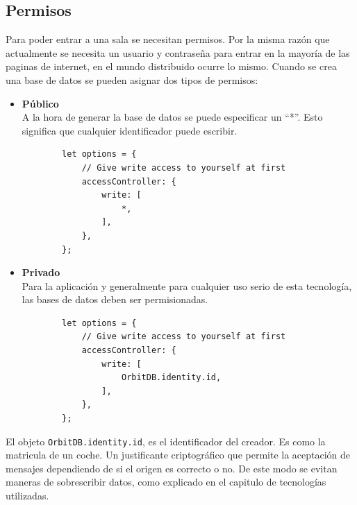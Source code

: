 \subsection{Permisos}
Para poder entrar a una sala se necesitan permisos. Por la misma razón que actualmente se necesita un usuario y contraseña para entrar en la mayoría de las paginas de internet, en el mundo distribuido ocurre lo mismo.
Cuando se crea una base de datos se pueden asignar dos tipos de permisos:
\begin{itemize}
    \item \textbf{Público}\\
    A la hora de generar la base de datos se puede especificar un ``*''. Esto significa que cualquier identificador puede escribir.
    \begin{lstlisting}
        let options = {
			// Give write access to yourself at first
			accessController: {
				write: [
					*,
				],
			},
		};
    \end{lstlisting}
    \item \textbf{Privado}\\
    Para la aplicación y generalmente para cualquier uso serio de esta tecnología, las bases de datos deben ser permisionadas.
    \begin{lstlisting}
        let options = {
			// Give write access to yourself at first
			accessController: {
				write: [
					OrbitDB.identity.id,
				],
			},
		};
    \end{lstlisting}
\end{itemize}
El objeto \verb|OrbitDB.identity.id|, es el identificador del creador. Es como la matricula de un coche. Un justificante criptográfico que permite la aceptación de mensajes dependiendo de si el origen es correcto o no. De este modo se evitan maneras de sobrescribir datos, como explicado en el capitulo de tecnologías utilizadas.
